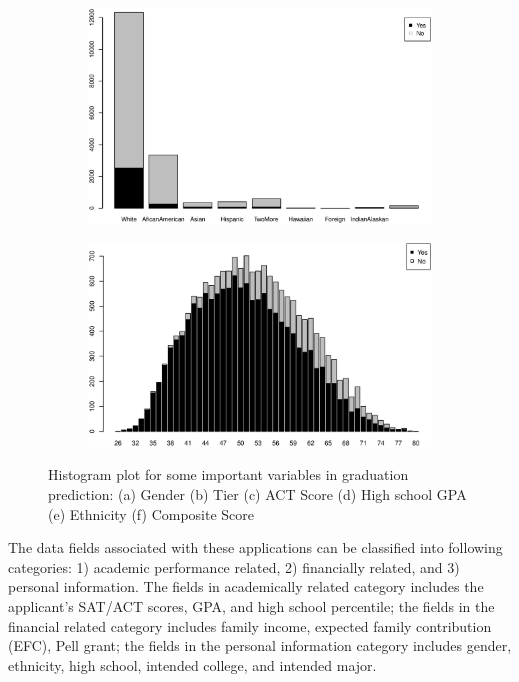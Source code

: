 \documentclass[12pt,english]{report}
\begin{document}
\begin{figure}[p]
\medskip
\begin{subfigure}{0.48\textwidth}
\includegraphics[width=\linewidth]{pic/grad_ethnicity}
\caption{} \label{grad:e}
\end{subfigure}\hspace*{\fill}
\begin{subfigure}{0.48\textwidth}
\includegraphics[width=\linewidth]{pic/grad_comp}
\caption{} \label{grad:f}
\end{subfigure}
  \caption{Histogram plot for some important variables in graduation
prediction: 
                        (a) Gender (b) Tier (c) ACT Score (d) High school GPA
(e) Ethnicity (f) Composite Score} 
  \label{grad_sum} 
\end{figure}


The data fields associated with these applications can be classified into
following categories: 1) academic performance related, 2) financially related,
and 3) personal information. The fields in academically related category includes
the applicant's SAT/ACT scores, GPA, and high school percentile; the  fields in the financial  related category includes family income, expected family
contribution (EFC), Pell grant; the fields in the personal information category
includes gender, ethnicity, high school, intended college, and intended major.
\end{document}
